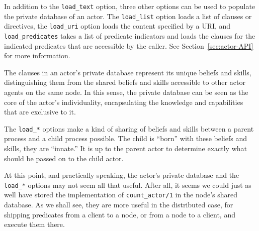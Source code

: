 \noindent %
In addition to the \texttt{load\_text} option, three other options can be used to populate the private database of an actor. The \texttt{load\_list} option loads a list of clauses or directives, the \texttt{load\_uri} option loads the content specified by a URI, and \texttt{load\_predicates} takes a list of predicate indicators and loads the clauses for the indicated predicates that are accessible by the caller. See Section~\ref{sec:actor-API} for more information. 

The clauses in an actor's private database represent its unique beliefs and skills, distinguishing them from the shared beliefs and skills accessible to other actor agents on the same node. In this sense, the private database can be seen as the core of the actor's individuality, encapsulating the knowledge and capabilities that are exclusive to it.

The \texttt{load\_*} options make a kind of sharing of beliefs and skills between a parent process and a child process possible. The child is ``born'' with these beliefs and skills, they are ``innate.'' It is up to the parent actor to determine exactly what should be passed on to the child actor. %

At this point, and practically speaking, the actor's private database and the \texttt{load\_*} options may not seem all that useful. After all, it seems we could just as well have stored the implementation of \texttt{count\_actor/1} in the node's shared database. As we shall see, they are more useful in the distributed case, for shipping predicates from a client to a node, or from a node to a client, and execute them there.

%


